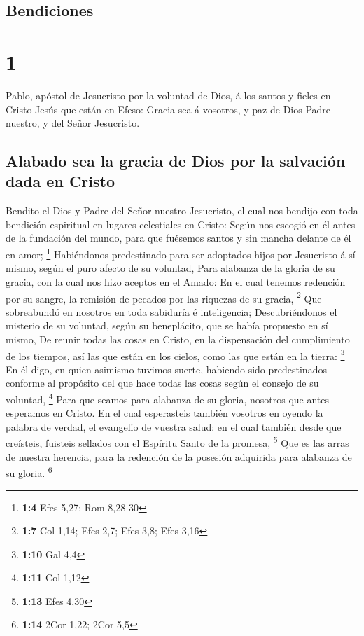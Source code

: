 \hypertarget{bendiciones}{%
\subsection{Bendiciones}\label{bendiciones}}

\hypertarget{section}{%
\section{1}\label{section}}

 Pablo, apóstol de Jesucristo por la voluntad de Dios, á los
santos y fieles en Cristo Jesús que están en Efeso:  Gracia
sea á vosotros, y paz de Dios Padre nuestro, y del Señor Jesucristo.

\hypertarget{alabado-sea-la-gracia-de-dios-por-la-salvaciuxf3n-dada-en-cristo}{%
\subsection{Alabado sea la gracia de Dios por la salvación dada en
Cristo}\label{alabado-sea-la-gracia-de-dios-por-la-salvaciuxf3n-dada-en-cristo}}

 Bendito el Dios y Padre del Señor nuestro Jesucristo, el
cual nos bendijo con toda bendición espiritual en lugares celestiales en
Cristo:  Según nos escogió en él antes de la fundación del
mundo, para que fuésemos santos y sin mancha delante de él en amor;
\footnote{\textbf{1:4} Efes 5,27; Rom 8,28-30}  Habiéndonos
predestinado para ser adoptados hijos por Jesucristo á sí mismo, según
el puro afecto de su voluntad,  Para alabanza de la gloria
de su gracia, con la cual nos hizo aceptos en el Amado:  En
el cual tenemos redención por su sangre, la remisión de pecados por las
riquezas de su gracia, \footnote{\textbf{1:7} Col 1,14; Efes 2,7; Efes
  3,8; Efes 3,16}  Que sobreabundó en nosotros en toda
sabiduría é inteligencia;  Descubriéndonos el misterio de su
voluntad, según su beneplácito, que se había propuesto en sí mismo,
 De reunir todas las cosas en Cristo, en la dispensación
del cumplimiento de los tiempos, así las que están en los cielos, como
las que están en la tierra: \footnote{\textbf{1:10} Gal 4,4}
 En él digo, en quien asimismo tuvimos suerte, habiendo
sido predestinados conforme al propósito del que hace todas las cosas
según el consejo de su voluntad, \footnote{\textbf{1:11} Col 1,12}
 Para que seamos para alabanza de su gloria, nosotros que
antes esperamos en Cristo.  En el cual esperasteis también
vosotros en oyendo la palabra de verdad, el evangelio de vuestra salud:
en el cual también desde que creísteis, fuisteis sellados con el
Espíritu Santo de la promesa, \footnote{\textbf{1:13} Efes 4,30}
 Que es las arras de nuestra herencia, para la redención de
la posesión adquirida para alabanza de su gloria. \footnote{\textbf{1:14}
  2Cor 1,22; 2Cor 5,5}

